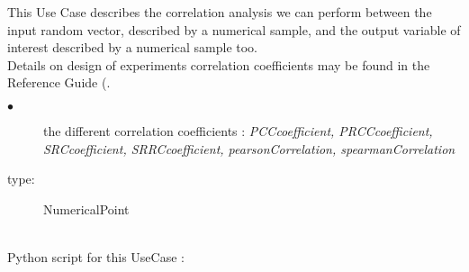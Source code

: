 \renewcommand{\filename}{docUC_CentralUncertainty_CorrelationAnalysis.tex}
\renewcommand{\filetitle}{UC : Correlation analysis on samples : Pearson and Spearman coefficients, PCC, PRCC, SRC, SRRC coefficients}

\HeaderIIILevel

\label{correlationAnalysis}




This Use Case  describes the correlation analysis we can perform between the input random  vector, described by a numerical sample, and the output variable of interest described by a numerical sample too.\\

Details on design of experiments correlation coefficients may be found in the Reference Guide (.\\



             {
               \begin{description}
               \item[$\bullet$] the different correlation coefficients : {\itshape PCCcoefficient, PRCCcoefficient, SRCcoefficient, SRRCcoefficient, pearsonCorrelation, spearmanCorrelation}
               \item[type:] NumericalPoint
               \end{description}
             }

             \textspace\\
             Python script for this UseCase :

